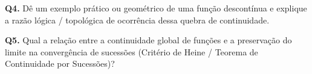 \begin{oralbox}
  \textbf{Q4.} Dê um exemplo prático ou geométrico de uma função descontínua e explique a razão lógica / topológica de ocorrência dessa quebra de continuidade.
\end{oralbox}

\begin{oralbox}
  \textbf{Q5.} Qual a relação entre a continuidade global de funções e a preservação do limite na convergência de sucessões (Critério de Heine / Teorema de Continuidade por Sucessões)?
\end{oralbox}
